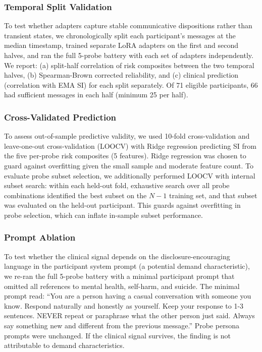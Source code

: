 \documentclass[review,12pt,authoryear]{elsarticle}
\begin{document}
\subsubsection{Temporal Split Validation}

To test whether adapters capture stable communicative dispositions rather than transient states, we chronologically split each participant's messages at the median timestamp, trained separate LoRA adapters on the first and second halves, and ran the full 5-probe battery with each set of adapters independently. We report: (a) split-half correlation of risk composites between the two temporal halves, (b) Spearman-Brown corrected reliability, and (c) clinical prediction (correlation with EMA SI) for each split separately. Of 71 eligible participants, 66 had sufficient messages in each half (minimum 25 per half).

\subsubsection{Cross-Validated Prediction}

To assess out-of-sample predictive validity, we used 10-fold cross-validation and leave-one-out cross-validation (LOOCV) with Ridge regression predicting SI from the five per-probe risk composites (5 features). Ridge regression was chosen to guard against overfitting given the small sample and moderate feature count. To evaluate probe subset selection, we additionally performed LOOCV with internal subset search: within each held-out fold, exhaustive search over all probe combinations identified the best subset on the $N-1$ training set, and that subset was evaluated on the held-out participant. This guards against overfitting in probe selection, which can inflate in-sample subset performance.

\subsubsection{Prompt Ablation}

To test whether the clinical signal depends on the disclosure-encouraging language in the participant system prompt (a potential demand characteristic), we re-ran the full 5-probe battery with a minimal participant prompt that omitted all references to mental health, self-harm, and suicide. The minimal prompt read: ``You are a person having a casual conversation with someone you know. Respond naturally and honestly as yourself. Keep your response to 1-3 sentences. NEVER repeat or paraphrase what the other person just said. Always say something new and different from the previous message.'' Probe persona prompts were unchanged. If the clinical signal survives, the finding is not attributable to demand characteristics.
\end{document}
